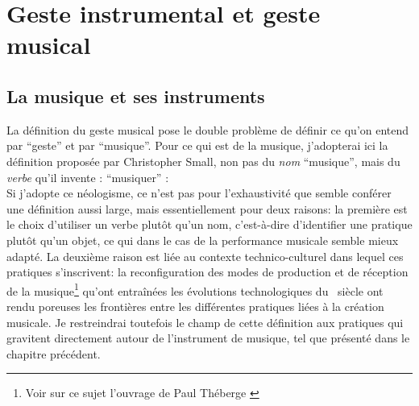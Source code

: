 
\section{Geste instrumental et geste musical}

\subsection{La musique et ses instruments}

\noindent La définition du geste musical pose le double problème de définir ce qu'on entend par ``geste'' et par ``musique''. Pour ce qui est de la musique, j'adopterai ici la définition proposée par Christopher Small, non pas du \textit{nom} ``musique'', mais du \textit{verbe} qu'il invente : ``musiquer'' \cite{small_musicking:_1998}:
\\
\indent Si j'adopte ce néologisme, ce n'est pas pour l'exhaustivité que semble conférer une définition aussi large, mais essentiellement pour deux raisons: la première est le choix d'utiliser un verbe plutôt qu'un nom, c'est-à-dire d'identifier une pratique plutôt qu'un objet, ce qui dans le cas de la performance musicale semble mieux adapté. La deuxième raison est liée au contexte technico-culturel dans lequel ces pratiques s'inscrivent: la reconfiguration des modes de production et de réception de la musique\footnote{Voir sur ce sujet l'ouvrage de Paul Théberge \cite{theberge_any_1997}} qu'ont entraînées les évolutions technologiques du ~siècle ont rendu poreuses les frontières entre les différentes pratiques liées à la création musicale. Je restreindrai toutefois le champ de cette définition aux pratiques qui gravitent directement autour de l'instrument de musique, tel que présenté dans le chapitre précédent.\\

